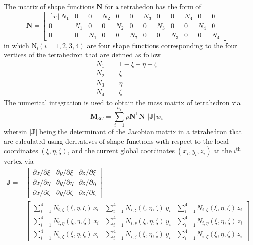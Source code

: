 The matrix of shape functions $\mathbf{N}$ for a tetrahedon has the form of
\begin{equation}
	\mathbf{N} =  
\begin{bmatrix*}[r]
	N_1 & 0 & 0 & N_2 & 0 & 0 & N_3 & 0 & 0 & N_4 & 0 & 0 \\
	0 & N_1 & 0 & 0 & N_2 & 0 & 0 & N_3 & 0 & 0 & N_4 & 0 \\
	0 & 0 & N_1 & 0 & 0 & N_2 & 0 & 0 & N_3 & 0 & 0 & N_4
\end{bmatrix*} 
	\label{shape3D}
\end{equation}
in which $\mathrm{N}_i (i = 1, 2, 3, 4)$ are four shape functions corresponding to the four vertices of the tetrahedron that are defined as follow
\begin{subequations}
\begin{align}
	N_1 & = 1 - \xi - \eta - \zeta \\
	N_2 & = \xi \\
	N_3 & = \eta \\
	N_4 & = \zeta
\end{align}
\end{subequations}
The numerical integration is used to obtain the mass matrix of tetrahedron via
\begin{equation}
    \mathbf{M}_{3C} = \sum_{i=1}^{n_i} \rho  \mathbf{N}^{\mathsf{T}} \mathbf{N} \,  \,|\mathbf{J}| \, w_i
\end{equation}
wherein $|\mathbf{J}|$ being the determinant of the Jacobian matrix in a tetrahedron that are calculated using derivatives of shape functions with respect to the local coordinates $(\xi, \eta, \zeta)$, and the current global coordinates $(x_i, y_i, z_i)$ at the $i^{\mathrm{th}}$ vertex via
\begin{equation}
\begin{aligned}
 \mathbf{J}= &
\begin{bmatrix}
\partial x / \partial\xi & \partial y / \partial\xi & \partial z / \partial\xi\\
\partial x / \partial\eta & \partial y / \partial\eta & \partial z / \partial\eta \\
\partial x / \partial\zeta & \partial y / \partial\zeta & \partial z / \partial\zeta 
\end{bmatrix}\\
  = & \begin{bmatrix}
\sum\nolimits_{i=1}^4 N_{i,\xi} (\xi,\eta,\zeta) \, x_i & \sum\nolimits_{i=1}^4 N_{i,\xi} (\xi,\eta,\zeta) \, y_i &
\sum\nolimits_{i=1}^4 N_{i,\xi} (\xi,\eta,\zeta) \, z_i\\
\sum\nolimits_{i=1}^4 N_{i,\eta} (\xi,\eta,\zeta) \, x_i & \sum\nolimits_{i=1}^4 N_{i,\eta} (\xi,\eta,\zeta) \, y_i &
\sum\nolimits_{i=1}^4 N_{i,\eta} (\xi,\eta,\zeta) \, z_i\\
\sum\nolimits_{i=1}^4 N_{i,\zeta} (\xi,\eta,\zeta) \, x_i & \sum\nolimits_{i=1}^4 N_{i,\zeta} (\xi,\eta,\zeta) \, y_i &
\sum\nolimits_{i=1}^4 N_{i,\zeta} (\xi,\eta,\zeta) \, z_i
\end{bmatrix}
\end{aligned}
\label{jacobiantet}
\end{equation}

